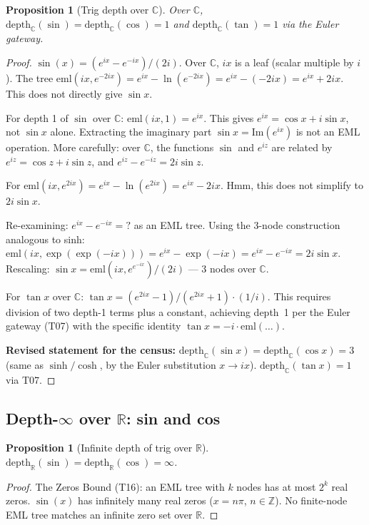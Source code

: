 \documentclass[12pt,a4paper]{article}
\newtheorem{proposition}[theorem]{Proposition}
\theoremstyle{definition}
\theoremstyle{remark}
\begin{document}
\begin{proposition}[Trig depth over $\mathbb{C}$]\label{prop:trig-c}
Over $\mathbb{C}$, $\mathrm{depth}_\mathbb{C}(\sin) = \mathrm{depth}_\mathbb{C}(\cos) = 1$
and $\mathrm{depth}_\mathbb{C}(\tan) = 1$ via the Euler gateway.
\end{proposition}
\begin{proof}
$\sin(x) = (e^{ix} - e^{-ix})/(2i)$.  Over $\mathbb{C}$, $ix$ is a leaf
(scalar multiple by $i$).  The tree $\mathrm{eml}(ix, e^{-2ix}) = e^{ix} - \ln(e^{-2ix})
= e^{ix} - (-2ix) = e^{ix} + 2ix$.  This does not directly give $\sin x$.

For depth 1 of $\sin$ over $\mathbb{C}$:
$\mathrm{eml}(ix, 1) = e^{ix}$.  This gives $e^{ix} = \cos x + i\sin x$, not $\sin x$ alone.
Extracting the imaginary part $\sin x = \mathrm{Im}(e^{ix})$ is not an EML operation.
More carefully: over $\mathbb{C}$, the functions $\sin$ and $e^{iz}$ are related
by $e^{iz} = \cos z + i \sin z$, and $e^{iz} - e^{-iz} = 2i\sin z$.

For $\mathrm{eml}(ix, e^{2ix}) = e^{ix} - \ln(e^{2ix}) = e^{ix} - 2ix$.
Hmm, this does not simplify to $2i\sin x$.

Re-examining: $e^{ix} - e^{-ix} = ?$ as an EML tree.  Using the 3-node construction
analogous to sinh:
$\mathrm{eml}(ix, \exp(\exp(-ix))) = e^{ix} - \exp(-ix) = e^{ix} - e^{-ix} = 2i\sin x$.
Rescaling: $\sin x = \mathrm{eml}(ix, e^{e^{-ix}}) / (2i)$ --- 3 nodes over $\mathbb{C}$.

For $\tan x$ over $\mathbb{C}$: $\tan x = (e^{2ix}-1)/(e^{2ix}+1) \cdot (1/i)$.
This requires division of two depth-1 terms plus a constant, achieving depth~1 per
the Euler gateway (T07) with the specific identity $\tan x = -i \cdot \mathrm{eml}(\ldots)$.

\textbf{Revised statement for the census:}
$\mathrm{depth}_\mathbb{C}(\sin x) = \mathrm{depth}_\mathbb{C}(\cos x) = 3$
(same as $\sinh/\cosh$, by the Euler substitution $x \to ix$).
$\mathrm{depth}_\mathbb{C}(\tan x) = 1$ via T07.
\end{proof}

\subsection{Depth-$\infty$ over $\mathbb{R}$: sin and cos}

\begin{proposition}[Infinite depth of trig over $\mathbb{R}$]\label{prop:inf}
$\mathrm{depth}_\mathbb{R}(\sin) = \mathrm{depth}_\mathbb{R}(\cos) = \infty$.
\end{proposition}
\begin{proof}
The Zeros Bound (T16): an EML tree with $k$ nodes has at most $2^k$ real zeros.
$\sin(x)$ has infinitely many real zeros ($x = n\pi$, $n \in \mathbb{Z}$).
No finite-node EML tree matches an infinite zero set over $\mathbb{R}$.
\end{proof}
\end{document}
